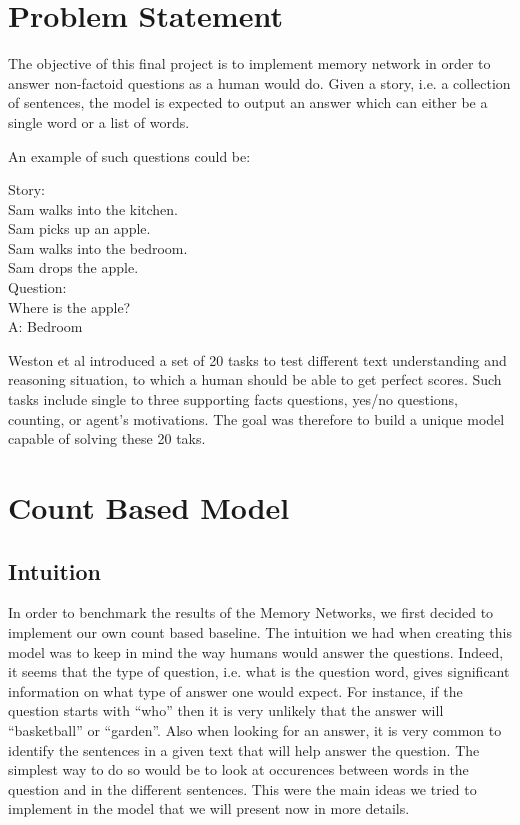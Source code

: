 \documentclass[twoside,11pt]{article}
\begin{document}
\section{Problem Statement}

The objective of this final project is to implement memory network in order to answer non-factoid questions as a human would do. Given a story, i.e. a collection of sentences, the model is expected to output an answer which can either be a single word or a list of words.

\noindent An example of such questions could be:

\begin{framed}
\begin{center}
Story: \\
Sam walks into the kitchen.\\
Sam picks up an apple.\\
Sam walks into the bedroom.\\
Sam drops the apple.\\
Question:\\
Where is the apple?\\
A: Bedroom
\end{center}
\end{framed}

\noindent Weston et al introduced a set of 20 tasks to test different text understanding and reasoning situation, to which a human should be able to get perfect scores. Such tasks include  single to three supporting facts questions, yes/no questions, counting, or agent's motivations. The goal was therefore to build a unique model capable of solving these 20 taks.

\section{Count Based Model}
\subsection{Intuition}
In order to benchmark the results of the Memory Networks, we first decided to implement our own count based baseline. The intuition we had when creating this model was to keep in mind the way humans would answer the questions. Indeed, it seems that the type of question, i.e. what is the question word, gives significant information on what type of answer one would expect. For instance, if the question starts with ``who'' then it is very unlikely that the answer will ``basketball'' or ``garden''. Also when looking for an answer, it is very common to identify the sentences in a given text that will help answer the question. The simplest way to do so would be to look at occurences between words in the question and in the different sentences. This were the main ideas we tried to implement in the model that we will present now in more details.
\end{document}
